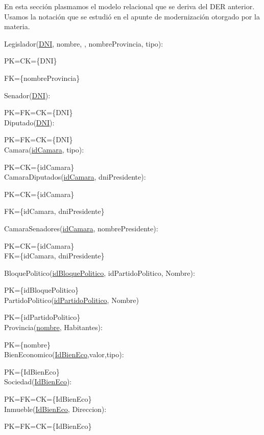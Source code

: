 En esta secci\'on plasmamos el modelo relacional que se deriva del DER anterior. Usamos la notaci\'on que se estudi\'o en el apunte de modernizaci\'on otorgado por la materia.

Legislador(\underline{DNI}, nombre, , nombreProvincia, tipo):

PK=CK={\{DNI}\}

FK={\{nombreProvincia}\}

Senador(\underline{DNI}):

PK=FK=CK={\{DNI}\}\\

Diputado(\underline{DNI}):

PK=FK=CK={\{DNI}\}\\

Camara(\underline{idCamara}, tipo):

PK=CK={\{idCamara}\}\\

CamaraDiputados(\underline{idCamara}, dniPresidente):

PK=CK={\{idCamara}\}

FK={\{idCamara, dniPresidente}\}

CamaraSenadores(\underline{idCamara}, nombrePresidente):

PK=CK={\{idCamara}\}\\

FK={\{idCamara, dniPresidente}\}

BloquePolitico(\underline{idBloquePolitico}, idPartidoPolitico, Nombre):

PK={\{idBloquePolitico}\}\\

PartidoPolitico(\underline{idPartidoPolitico}, Nombre)

PK={\{idPartidoPolitico}\}\\

Provincia(\underline{nombre}, Habitantes):

PK={\{nombre}\}\\

BienEconomico(\underline{IdBienEco},valor,tipo):

PK={\{IdBienEco}\}\\

Sociedad(\underline{IdBienEco}):

PK=FK=CK={\{IdBienEco}\}\\

Inmueble(\underline{IdBienEco}, Direccion):

PK=FK=CK={\{IdBienEco}\}\\

